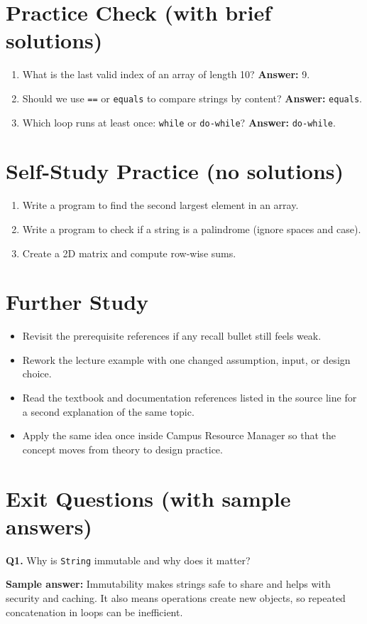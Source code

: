 \documentclass[11pt]{article}
\begin{document}
\section{Practice Check (with brief solutions)}
\begin{enumerate}
  \item What is the last valid index of an array of length 10?\; \textbf{Answer:} 9.
  \item Should we use \texttt{==} or \texttt{equals} to compare strings by content?\; \textbf{Answer:} \texttt{equals}.
  \item Which loop runs at least once: \texttt{while} or \texttt{do-while}?\; \textbf{Answer:} \texttt{do-while}.
\end{enumerate}

\section{Self-Study Practice (no solutions)}
\begin{enumerate}
  \item Write a program to find the second largest element in an array.
  \item Write a program to check if a string is a palindrome (ignore spaces and case).
  \item Create a 2D matrix and compute row-wise sums.
\end{enumerate}

\section{Further Study}
\begin{itemize}
  \item Revisit the prerequisite references if any recall bullet still feels weak.
  \item Rework the lecture example with one changed assumption, input, or design choice.
  \item Read the textbook and documentation references listed in the source line for a second explanation of the same topic.
  \item Apply the same idea once inside Campus Resource Manager so that the concept moves from theory to design practice.
\end{itemize}
\notesources{\OOPSUnitISources}

\section{Exit Questions (with sample answers)}
\textbf{Q1.} Why is \texttt{String} immutable and why does it matter?\par
\textbf{Sample answer:} Immutability makes strings safe to share and helps with security and caching. It also means operations create new objects, so repeated concatenation in loops can be inefficient.
\end{document}

